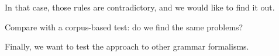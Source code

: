 In that case, those rules are contradictory, and we would like to find it out.

Compare with a corpus-based test: do we find the same problems?

Finally, we want to test the approach to other grammar formalisms.




